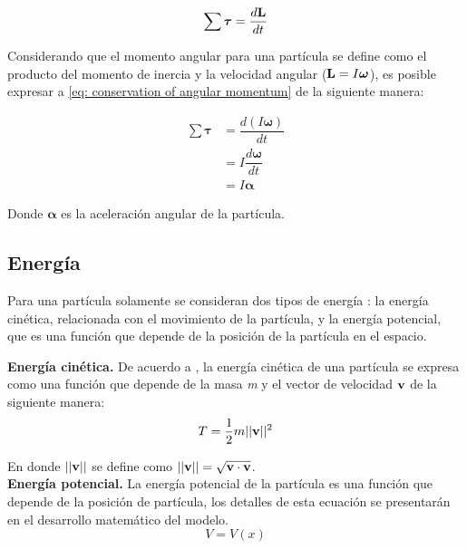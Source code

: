 \begin{equation}
  \sum \boldsymbol{\tau} = \dfrac{d \bold{L}}{dt}
  \label{eq: conservation of angular momentum}
\end{equation}

Considerando que el momento angular para una partícula
se define como el producto del momento de inercia 
y la velocidad angular
($\bold{L} = I \boldsymbol{\omega}$), es posible 
expresar a \eqref{eq: conservation of angular momentum}
de la siguiente manera:

\begin{equation}
 \begin{split}
  \sum \boldsymbol{\tau} &= \dfrac{d (I \boldsymbol{\omega})}{dt} \\
  &= I \dfrac{d \boldsymbol \omega}{dt}\\
  &= I \boldsymbol{\alpha}
 \end{split}
 \label{eq: angular momentum and torque}
\end{equation}

Donde $\boldsymbol \alpha$ es la aceleración angular de la partícula.

\subsection{Energía}

Para una partícula solamente se consideran dos tipos de 
energía \cite{susskind2014theoretical}: la energía cinética,
relacionada con el movimiento de la partícula, y la 
energía potencial, que es una función que depende de la 
posición de la partícula en el espacio.

 \textbf{Energía cinética.}
 De acuerdo a \cite{díaz20183d}, 
 la energía cinética de una partícula se expresa como una 
 función que depende de la masa \emph m y 
 el vector de velocidad $\bold v$ de
 la siguiente manera: 
 \begin{equation}
  T = \dfrac{1}{2} m ||\bold v ||^2
  \label{eq: kinetic energy}
 \end{equation}

 En donde $||\bold v ||$ se define como $||\bold v|| = \sqrt{\bold v \cdot \bold v}$.\\
 
 \textbf{Energía potencial.}  
 La energía potencial de la partícula es una función 
 que depende de la posición de partícula, los detalles de esta 
 ecuación se presentarán en el desarrollo matemático
 del modelo.
 \begin{equation}
    V = V(x)
  \label{eq: potential energy}
 \end{equation}


